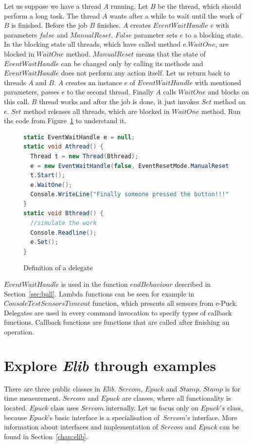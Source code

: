   Let us suppose we have a thread $A$ running. Let $B$ be the thread, 
  which should perform a long task. 
  The thread $A$ wants after a while to wait until the work of $B$ is finished.
  Before the job $B$ finishes. $A$ creates $EventWaitHandle$ $e$ 
  with parameters $false$ and $ManualReset$. 
  $False$ parameter sets $e$ to a blocking state. In the blocking state all threads, 
  which have called method $e.WaitOne$, 
  are blocked in $WaitOne$ method. $ManualReset$ means that the state of $EventWaitHandle$ 
  can be changed only by calling its methods and $EventWaitHandle$ 
  does not perform any action itself.
  Let us return back to threads $A$ and $B$. $A$ creates an instance $e$ of $EventWaitHandle$ with mentioned parameters, 
  passes $e$ to the second thread. 
  Finally $A$ calls $WaitOne$ and blocks on this call.
  $B$ thread works and after the job is done, it just invokes $Set$ method on $e$. 
  $Set$ method releases all threads, which are blocked in $WaitOne$ method.
  Run the code from Figure~\ref{ewh} to understand it.

          
\begin{figure}[!hbp]
\begin{lstlisting}[language=cs]
static EventWaitHandle e = null;
static void Athread() {
  Thread t = new Thread(Bthread);
  e = new EventWaitHandle(false, EventResetMode.ManualReset);
  t.Start();
  e.WaitOne();
  Console.WriteLine("Finally someone pressed the button!!!");
}
static void Bthread() {
  //simulate the work      
  Console.Readline();
  e.Set();
}
\end{lstlisting}
\caption{Definition of a delegate} \label{ewh}
\end{figure}

   $EventWaitHandle$ is used in the function $endBehaviour$ described in Section~\ref{sec:bull}.
   Lambda functions can be seen for example in $ConsoleTestSensorsTimeout$ function, 
   which presents all sensors from e-Puck.
   Delegates are used in every command invocation to specify types of callback functions.
   Callback functions are functions that are called after finishing an operation. 
  
\section{Explore {\it Elib} through examples} \label{sec:interfaces}
  There are three public classes in {\it Elib}. $Sercom$, $Epuck$ and $Stamp$.
  $Stamp$ is for time measurement. $Sercom$ and $Epuck$ are classes, 
  where all functionality is located.
  $Epuck$ class uses $Sercom$ internally.
  Let us focus only on $Epuck's$ class, 
  because $Epuck$'s basic interface is a specialisation of~$Sercom$'s
  interface. 
  More information about interfaces and implementation of $Sercom$ and 
  $Epuck$ can be found in Section~\ref{chap:elib}.

